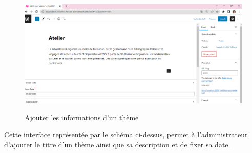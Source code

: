 \begin{figure}[!h]
	\centering
	{\includegraphics[width=1\textwidth]{D) IMAGES/Champs.png}}
	\caption{Ajouter les informations d'un thème}
	\label{Diagramme3}
\end{figure}
\newpage
Cette interface représentée par le schéma ci-dessus, permet à l'administrateur d'ajouter le titre d'un thème ainsi que sa description et de fixer sa date.

